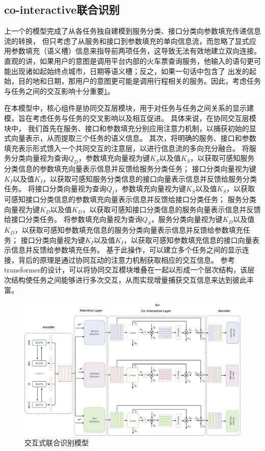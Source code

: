 \subsection{co-interactive联合识别}
上一个的模型完成了从各任务独自建模到服务分类、接口分类向参数填充传递信息流的转换，
但只考虑了从服务和接口到参数填充的单向信息流，而忽略了显式应用参数填充（语义槽）信息来指导前两项任务，这导致无法有效地建立双向连接。
直观的讲，如果用户的意图是调用平台内部的火车票查询服务，他输入的语句更可能出现诸如起始终点城市，日期等语义槽；反之，如果一句话中包含了
出发的起始，目的地和日期，那用户的意图更可能是调用行程相关的服务。因此，考虑任务与任务之间的交互影响十分重要\ref{fig:lianhe2}。

在本模型中，核心组件是协同交互层模块，用于对任务与任务之间关系的显示建模，旨在考虑任务与任务的交叉影响以及相互促进。
具体来说，在协同交互层模块中，
我们首先在服务、接口和参数填充分别应用注意力机制，以捕获初始的显式向量表示，从而提取三个任务的语义信息。
其次，将明确的服务、接口和参数填充表示形式馈入一个共同交互的注意层，以进行信息流的多向充分融合。
将服务分类向量视为查询$Q_D$，参数填充向量视为键$K_S$以及值$K_S$，以获取可感知服务分类信息的参数填充向量表示信息并反馈给服务分类任务；
接口分类向量视为键$K_I$以及值$K_I$，以获取可感知服务分类信息的接口向量表示信息并反馈给服务分类任务。
将接口分类向量视为查询$Q_I$，参数填充向量视为键$K_S$以及值$K_S$，以获取可感知接口分类信息的参数填充向量表示信息并反馈给接口分类任务；
服务分类向量视为键$K_D$以及值$K_D$，以获取可感知接口分类信息的服务向量表示信息并反馈给接口分类任务。
将参数填充向量视为查询$Q_S$，服务分类向量视为键$K_D$以及值$K_D$，以获取可感知参数填充信息的服务分类向量表示信息并反馈给参数填充任务；
接口分类向量视为键$K_I$以及值$K_I$，以获取可感知参数填充信息的接口向量表示信息并反馈给参数填充任务。
基于此操作，可以建立多个任务之间的显示连接，背后的原理是通过协同互动的注意力机制获取相应的交互信息。
参考transformer的设计，可以将协同交互模块堆叠在一起以形成一个层次结构，该层次结构使任务之间能够进行多次交互，从而实现增量捕获交互信息来达到彼此丰富。

\begin{figure}[htbp]
  \centering
  \includegraphics[width=16cm]{./images/co-interactive.jpg}
  \caption{交互式联合识别模型}
  \label{fig:lianhe2}
\end{figure}


